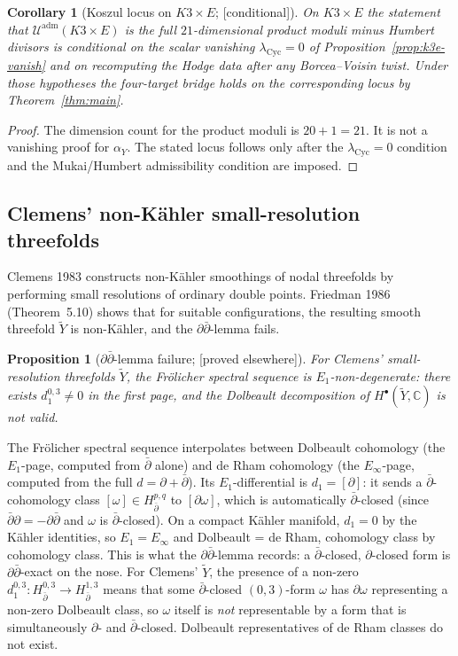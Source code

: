 \documentclass[11pt,reqno]{amsart}
\theoremstyle{plain}
\newtheorem{proposition}[theorem]{Proposition}
\newtheorem{corollary}[theorem]{Corollary}
\theoremstyle{definition}
\theoremstyle{remark}
\providecommand{\ClaimStatusProvedElsewhere}{\textnormal{[proved elsewhere]}}
\providecommand{\ClaimStatusConditional}{\textnormal{[conditional]}}
\newcommand{\Cbb}{\mathbb{C}}
\newcommand{\cU}{\mathcal{U}}
\begin{document}
\begin{corollary}[Koszul locus on $K3 \times E$; \ClaimStatusConditional]
\label{cor:k3e-locus}
On $K3 \times E$ the statement that $\cU^{\mathrm{adm}}(K3 \times E)$ is the full $21$-dimensional product moduli minus Humbert divisors is conditional on the scalar vanishing $\lambda_{\mathrm{Cyc}}=0$ of Proposition~\ref{prop:k3e-vanish} and on recomputing the Hodge data after any Borcea--Voisin twist. Under those hypotheses the four-target bridge holds on the corresponding locus by Theorem~\ref{thm:main}.
\end{corollary}

\begin{proof}
The dimension count for the product moduli is $20+1=21$. It is not a
vanishing proof for $\alpha_Y$. The stated locus follows only after the
$\lambda_{\mathrm{Cyc}}=0$ condition and the Mukai/Humbert admissibility
condition are imposed.
\end{proof}

\subsection{Clemens' non-Kähler small-resolution threefolds}
Clemens 1983 constructs non-Kähler smoothings of nodal threefolds by performing small resolutions of ordinary double points. Friedman 1986 (Theorem~5.10) shows that for suitable configurations, the resulting smooth threefold $\tilde Y$ is non-Kähler, and the $\partial\bar\partial$-lemma fails.

\begin{proposition}[$\partial\bar\partial$-lemma failure; \ClaimStatusProvedElsewhere]
\label{prop:clemens-ddbar}
For Clemens' small-resolution threefolds $\tilde Y$, the Frölicher spectral sequence is $E_1$-non-degenerate: there exists $d_1^{0,3} \neq 0$ in the first page, and the Dolbeault decomposition of $H^\bullet(\tilde Y, \Cbb)$ is not valid.
\end{proposition}

The Frölicher spectral sequence interpolates between Dolbeault cohomology (the $E_1$-page, computed from $\bar\partial$ alone) and de Rham cohomology (the $E_\infty$-page, computed from the full $d = \partial + \bar\partial$). Its $E_1$-differential is $d_1 = [\partial]$: it sends a $\bar\partial$-cohomology class $[\omega] \in H^{p,q}_{\bar\partial}$ to $[\partial \omega]$, which is automatically $\bar\partial$-closed (since $\bar\partial \partial = - \partial \bar\partial$ and $\omega$ is $\bar\partial$-closed). On a compact Kähler manifold, $d_1 = 0$ by the Kähler identities, so $E_1 = E_\infty$ and Dolbeault = de Rham, cohomology class by cohomology class. This is what the $\partial\bar\partial$-lemma records: a $\bar\partial$-closed, $\partial$-closed form is $\partial\bar\partial$-exact on the nose. For Clemens' $\tilde Y$, the presence of a non-zero $d_1^{0,3} : H^{0,3}_{\bar\partial} \to H^{1,3}_{\bar\partial}$ means that some $\bar\partial$-closed $(0,3)$-form $\omega$ has $\partial \omega$ representing a non-zero Dolbeault class, so $\omega$ itself is \emph{not} representable by a form that is simultaneously $\partial$- and $\bar\partial$-closed. Dolbeault representatives of de Rham classes do not exist.
\end{document}
